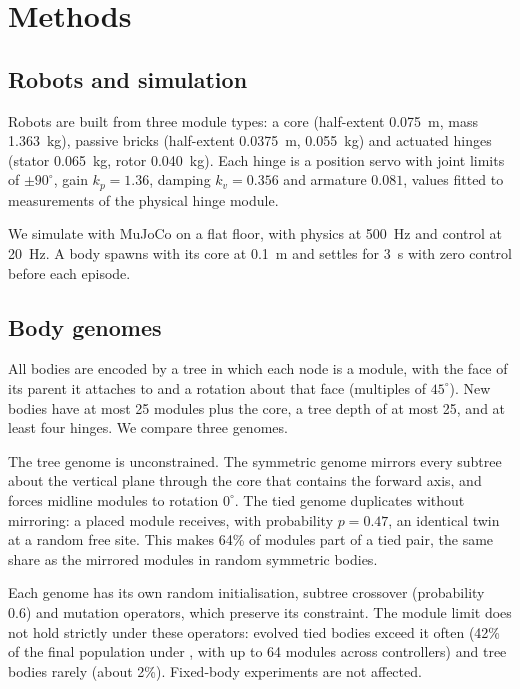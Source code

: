 \section{Methods}
\label{sec:methods}

\subsection{Robots and simulation}
\label{sec:robots}

Robots are built from three module types: a core (half-extent \SI{0.075}{m}, mass \SI{1.363}{kg}), passive bricks (half-extent \SI{0.0375}{m}, \SI{0.055}{kg}) and actuated hinges (stator \SI{0.065}{kg}, rotor \SI{0.040}{kg}). Each hinge is a position servo with joint limits of $\pm 90^\circ$, gain $k_p = 1.36$, damping $k_v = 0.356$ and armature $0.081$, values fitted to measurements of the physical hinge module.

We simulate with MuJoCo on a flat floor, with physics at \SI{500}{Hz} and control at \SI{20}{Hz}. A body spawns with its core at \SI{0.1}{m} and settles for \SI{3}{s} with zero control before each episode.

\subsection{Body genomes}
\label{sec:genomes}

All bodies are encoded by a tree in which each node is a module, with the face of its parent it attaches to and a rotation about that face (multiples of $45^\circ$). New bodies have at most 25 modules plus the core, a tree depth of at most 25, and at least four hinges. We compare three genomes.

The tree genome is unconstrained. The symmetric genome mirrors every subtree about the vertical plane through the core that contains the forward axis, and forces midline modules to rotation $0^\circ$. The tied genome duplicates without mirroring: a placed module receives, with probability $p = 0.47$, an identical twin at a random free site. This makes 64\% of modules part of a tied pair, the same share as the mirrored modules in random symmetric bodies.

Each genome has its own random initialisation, subtree crossover (probability 0.6) and mutation operators, which preserve its constraint. The module limit does not hold strictly under these operators: evolved tied bodies exceed it often (42\% of the final population under \bb, with up to 64 modules across controllers) and tree bodies rarely (about 2\%). Fixed-body experiments are not affected.

